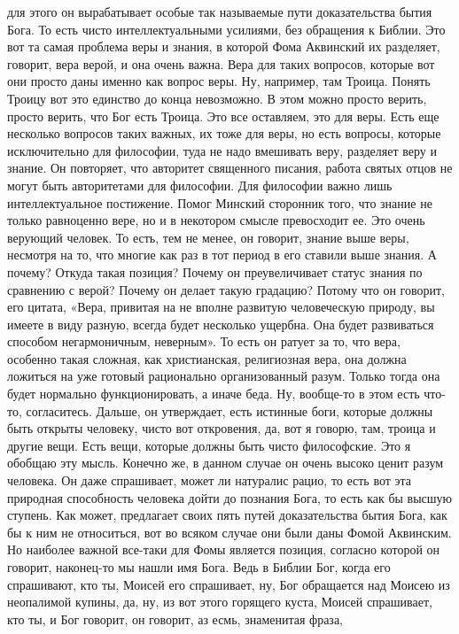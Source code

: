 для этого он вырабатывает особые так называемые пути доказательства бытия Бога.
То есть чисто интеллектуальными усилиями, без обращения к Библии. Это вот та
самая проблема веры и знания, в которой Фома Аквинский их разделяет, говорит,
вера верой, и она очень важна. Вера для таких вопросов, которые вот они просто
даны именно как вопрос веры. Ну, например, там Троица. Понять Троицу вот это
единство до конца невозможно. В этом можно просто верить, просто верить, что Бог
есть Троица. Это все оставляем, это для веры. Есть еще несколько вопросов таких
важных, их тоже для веры, но есть вопросы, которые исключительно для философии,
туда не надо вмешивать веру, разделяет веру и знание. Он повторяет, что
авторитет священного писания, работа святых отцов не могут быть авторитетами для
философии. Для философии важно лишь интеллектуальное постижение. Помог Минский
сторонник того, что знание не только равноценно вере, но и в некотором смысле
превосходит ее. Это очень верующий человек. То есть, тем не менее, он говорит,
знание выше веры, несмотря на то, что многие как раз в тот период в его ставили
выше знания. А почему? Откуда такая позиция? Почему он преувеличивает статус
знания по сравнению с верой? Почему он делает такую градацию? Потому что он
говорит, его цитата, «Вера, привитая на не вполне развитую человеческую природу,
вы имеете в виду разную, всегда будет несколько ущербна. Она будет развиваться
способом негармоничным, неверным». То есть он ратует за то, что вера, особенно
такая сложная, как христианская, религиозная вера, она должна ложиться на уже
готовый рационально организованный разум. Только тогда она будет нормально
функционировать, а иначе беда. Ну, вообще-то в этом есть что-то, согласитесь.
Дальше, он утверждает, есть истинные боги, которые должны быть открыты человеку,
чисто вот откровения, да, вот я говорю, там, троица и другие вещи. Есть вещи,
которые должны быть чисто философские. Это я обобщаю эту мысль. Конечно же, в
данном случае он очень высоко ценит разум человека. Он даже спрашивает, может ли
натуралис рацио, то есть вот эта природная способность человека дойти до
познания Бога, то есть как бы высшую ступень. Как может, предлагает своих пять
путей доказательства бытия Бога, как бы к ним не относиться, вот во всяком
случае они были даны Фомой Аквинским. Но наиболее важной все-таки для Фомы
является позиция, согласно которой он говорит, наконец-то мы нашли имя Бога.
Ведь в Библии Бог, когда его спрашивают, кто ты, Моисей его спрашивает, ну, Бог
обращается над Моисею из неопалимой купины, да, ну, из вот этого горящего куста,
Моисей спрашивает, кто ты, и Бог говорит, он говорит, аз есмь, знаменитая фраза,

